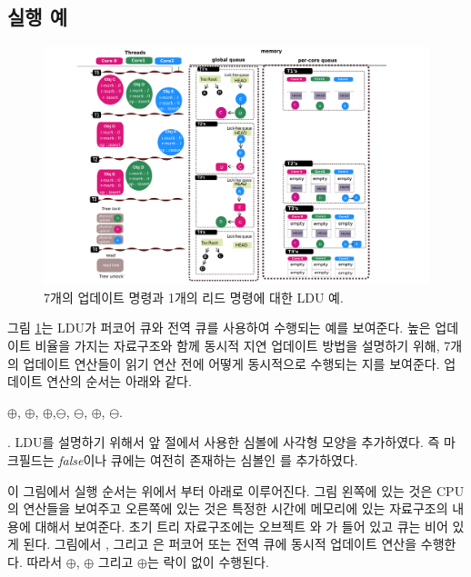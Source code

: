 \subsection{실행 예}
\begin{figure}[h!]
  \begin{center}
     \includegraphics[width=1.0\textwidth,height=0.4\textheight]{fig/basic_gldu}
  \end{center}
  \caption{7개의 업데이트 명령과 1개의 리드 명령에 대한 LDU 예.}
  \label{fig:basic}
\end{figure}


그림 \ref{fig:basic}는 LDU가 퍼코어 큐와 전역 큐를 사용하여 수행되는 예를 보여준다.
높은 업데이트 비율을 가지는 자료구조와 함께 동시적 지연 업데이트 방법을 설명하기 
위해, 7개의 업데이트 연산들이 읽기 연산 전에 어떻게 동시적으로 수행되는 지를 보여준다. 
업데이트 연산의 순서는 아래와 같다. 
\begin{center}
$\oplus$, $\oplus$, $\oplus$,$\ominus$,
$\ominus$, $\oplus$, $\ominus$. 
\end{center}.
LDU를 설명하기 위해서 앞 절에서 사용한 심볼에 사각형 모양을 추가하였다. 
즉 마크필드는 \textit{false}이나 큐에는 여전히 존재하는 심볼인 를 
추가하였다.

이 그림에서 실행 순서는 위에서 부터 아래로 이루어진다.
그림 왼쪽에 있는 것은 CPU의 연산들을 보여주고 오른쪽에 있는 것은 특정한 시간에 메모리에 있는
자료구조의 내용에 대해서 보여준다. 
초기 트리 자료구조에는 오브젝트 와 가 들어 있고 큐는 비어 있게 된다.
그림에서 ,  그리고 은 
퍼코어 또는 전역 큐에 동시적 업데이트 연산을 수행한다.
따라서 $\oplus$, $\oplus$ 그리고 $\oplus$는 락이 없이 수행된다.

